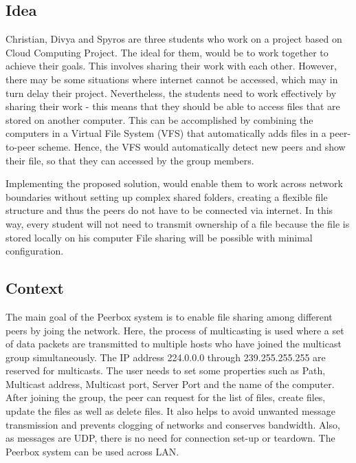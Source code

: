 
\subsection{Idea}

Christian, Divya and Spyros are three students who work on a project based on Cloud Computing Project. The ideal for them, would be to work together to achieve their goals. This involves sharing their work with each other. However, there may be some situations where internet cannot be accessed, which may in turn delay their project. Nevertheless, the students need to work effectively by sharing their work - this means that they should be able to access files that are stored on another computer. This can be accomplished by combining the computers in a Virtual File System (VFS) that automatically adds files in a peer-to-peer scheme. Hence, the VFS would automatically detect new peers and show their file, so that they can accessed by the group members.

Implementing the proposed solution, would  enable them to work across network boundaries without setting up complex shared folders, creating a flexible file structure and thus the peers do not have to be connected via internet. In this way, every student will not need to transmit ownership of a file because the file is stored locally on his computer File sharing will be possible with minimal configuration. 



\subsection{Context}
The main goal of the Peerbox system is to enable file sharing among different peers by joing the network. Here, the process of multicasting is used where a set of data packets are transmitted to  multiple hosts who have joined the multicast group simultaneously. The IP address 224.0.0.0 through 239.255.255.255 are reserved for multicasts. The user needs to set some properties such as Path, Multicast address, Multicast port, Server Port and the name of the computer. After joining the group, the peer can request for the list of files, create files, update the files as well as delete files. It also helps to avoid unwanted message transmission and prevents clogging of networks and conserves bandwidth. Also, as messages are UDP, there is no need for connection set-up or teardown. The Peerbox system can be used across LAN.  


